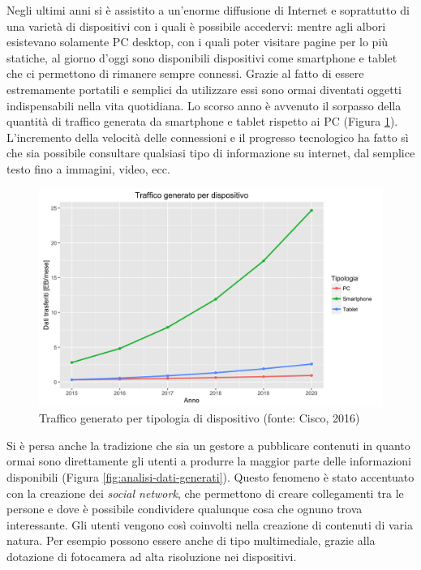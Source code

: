 Negli ultimi anni si è assistito a un'enorme diffusione di Internet e soprattutto di una varietà di dispositivi con i quali è possibile accedervi: mentre agli albori esistevano solamente PC desktop, con i quali poter visitare pagine per lo più statiche, al giorno d'oggi sono disponibili dispositivi come smartphone e tablet che ci permettono di rimanere sempre connessi. Grazie al fatto di essere estremamente portatili e semplici da utilizzare essi sono ormai diventati oggetti indispensabili nella vita quotidiana. Lo scorso anno è avvenuto il sorpasso della quantità di traffico generata da smartphone e tablet rispetto ai PC (Figura \ref{fig:traffico-tipologia-dispositivo}). L'incremento della velocità delle connessioni e il progresso tecnologico ha fatto sì che sia possibile consultare qualsiasi tipo di informazione su internet, dal semplice testo fino a immagini, video, ecc.

\begin{figure}[ht]
	\centering
	\includegraphics[width=\textwidth]{1-introduzione/Immagini/traffico-dispositivi.png}
	\caption[Traffico generato per tipologia di dispositivo]{Traffico generato per tipologia di dispositivo (fonte: Cisco, 2016)\label{fig:traffico-tipologia-dispositivo}}
\end{figure}

Si è persa anche la tradizione che sia un gestore a pubblicare contenuti in quanto ormai sono direttamente gli utenti a produrre la maggior parte delle informazioni disponibili (Figura \ref{fig:analisi-dati-generati}). Questo fenomeno è stato accentuato con la creazione dei \emph{social network}, che permettono di creare collegamenti tra le persone e dove è possibile condividere qualunque cosa che ognuno trova interessante. Gli utenti vengono così coinvolti nella creazione di contenuti di varia natura. Per esempio possono essere anche di tipo multimediale, grazie alla dotazione di fotocamera ad alta risoluzione nei dispositivi.

